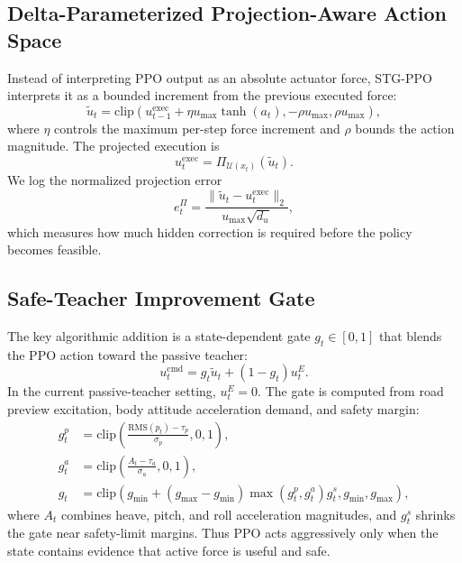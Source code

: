 \documentclass[letterpaper,twocolumn]{article}
\begin{document}
\subsection{Delta-Parameterized Projection-Aware Action Space}

Instead of interpreting PPO output as an absolute actuator force, STG-PPO interprets it as a bounded increment from the previous executed force:
\begin{equation}
    \tilde{u}_t
    =
    \mathrm{clip}\left(
        u^{\mathrm{exec}}_{t-1}
        +
        \eta u_{\max} \tanh(a_t),
        -\rho u_{\max}, \rho u_{\max}
    \right),
\end{equation}
where $\eta$ controls the maximum per-step force increment and $\rho$ bounds the action magnitude.
The projected execution is
\begin{equation}
    u^{\mathrm{exec}}_t=\Pi_{\mathcal{U}(x_t)}(\tilde{u}_t).
\end{equation}
We log the normalized projection error
\begin{equation}
    e^\Pi_t =
    \frac{\|\tilde{u}_t-u^{\mathrm{exec}}_t\|_2}{u_{\max}\sqrt{d_u}},
\end{equation}
which measures how much hidden correction is required before the policy becomes feasible.

\subsection{Safe-Teacher Improvement Gate}

The key algorithmic addition is a state-dependent gate $g_t \in [0,1]$ that blends the PPO action toward the passive teacher:
\begin{equation}
    u^{\mathrm{cmd}}_t
    =
    g_t \tilde{u}_t + (1-g_t)u^{E}_t.
\end{equation}
In the current passive-teacher setting, $u^E_t=0$.
The gate is computed from road preview excitation, body attitude acceleration demand, and safety margin:
\begin{align}
    g^{p}_t &= \mathrm{clip}\left(
        \frac{\mathrm{RMS}(p_t)-\tau_p}{\sigma_p},0,1
    \right),\\
    g^{a}_t &= \mathrm{clip}\left(
        \frac{A_t-\tau_a}{\sigma_a},0,1
    \right),\\
    g_t &= \mathrm{clip}\left(
        g_{\min} + (g_{\max}-g_{\min})
        \max(g^{p}_t,g^{a}_t)g^{s}_t,
        g_{\min},g_{\max}
    \right),
\end{align}
where $A_t$ combines heave, pitch, and roll acceleration magnitudes, and $g^s_t$ shrinks the gate near safety-limit margins.
Thus PPO acts aggressively only when the state contains evidence that active force is useful and safe.
\end{document}
